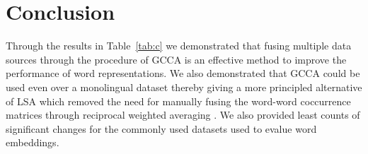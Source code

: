 \section{Conclusion}
Through the results in Table~\ref{tab:c} we demonstrated that fusing
multiple data sources through the procedure of GCCA is an effective
method to improve the performance of word representations. We also
demonstrated that GCCA could be used even over a monolingual dataset
thereby giving a more principled alternative of LSA which removed the
need for manually fusing the word-word coccurrence matrices through
reciprocal weighted averaging \cite{pennington2014glove}. We also
provided least counts of significant changes for the commonly used
datasets used to evalue word embeddings. 


